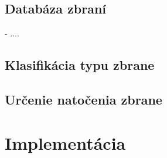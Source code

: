 \section{Databáza zbraní}
- ....

\section{Klasifikácia typu zbrane}

\section{Určenie natočenia zbrane}


\pagebreak
\chapter{Implementácia}
